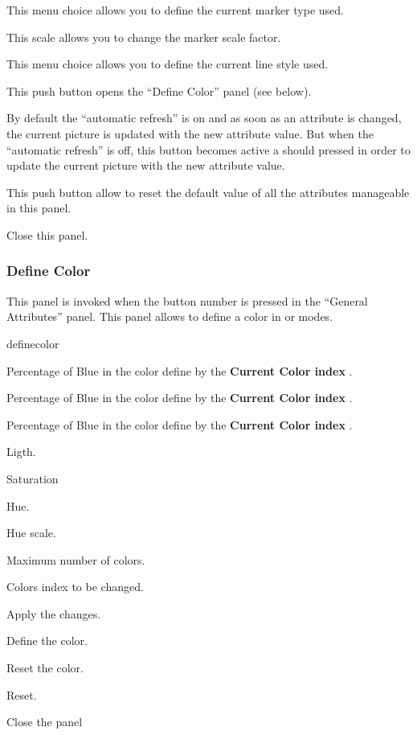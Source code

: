 \begin{EnumZW}
\item This menu choice allows you to define the current marker type used.
\par
{}
\item This scale allows you to change the marker scale factor.
\item This menu choice allows you to define the current line style used.
\item This push button opens the ``Define Color'' panel (see below).
\end{EnumZW}
\begin{EnumZB}
\item By default the ``automatic refresh'' is on and as soon as an attribute
      is changed, the current picture is updated with the new attribute
      value. But when the ``automatic refresh'' is off, this button becomes
      active a should pressed in order to update the current picture with
      the new attribute value. 
\item This push button allow to reset the default value of all the attributes
      manageable in this panel.
\item Close this panel.
\end{EnumZB}

\subsubsection{Define Color}

This panel is invoked when the button number  is pressed in the
``General Attributes'' panel. This panel allows to define a color in
 or  modes.

\begin{PAWf}[.65]{definecolor}

\begin{EnumZW}
\item Percentage of Blue in the color define by the {\bf Current Color index}
      .
\item Percentage of Blue in the color define by the {\bf Current Color index}
      .
\item Percentage of Blue in the color define by the {\bf Current Color index}
      .
\item Ligth.
\item Saturation
\item Hue.
\item Hue scale.
\item Maximum number of colors.
\item Colors index to be changed.
\end{EnumZW}
\begin{EnumZB}
\item Apply the changes.
\item Define the color.
\item Reset the color.
\item Reset.
\item Close the panel
\end{EnumZB}
\end{PAWf}

